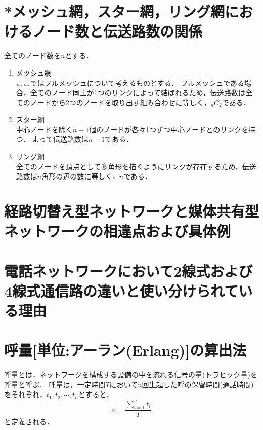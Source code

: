 \documentclass[10.5pt]{jsarticle}
\begin{document}
\section{*メッシュ網，スター網，リング網におけるノード数と伝送路数の関係}
全てのノード数を$n$とする．
\begin{enumerate}
\item{メッシュ網}\\
ここではフルメッシュについて考えるものとする．
フルメッシュである場合，全てのノード同士が1つのリンクによって結ばれるため，伝送路数は全てのノードから2つのノードを取り出す組み合わせに等しく，\underline{${}_nC_2$}である．
\item{スター網}\\
中心ノードを除く$n-1$個のノードが各々1つずつ中心ノードとのリンクを持つ．
よって伝送路数は\underline{$n-1$}である．
\item{リング網}\\
全てのノードを頂点として多角形を描くようにリンクが存在するため，伝送路数は$n$角形の辺の数に等しく，\underline{$n$}である．
\end{enumerate}

\section{経路切替え型ネットワークと媒体共有型ネットワークの相違点および具体例}


\section{電話ネットワークにおいて2線式および4線式通信路の違いと使い分けられている理由}


\section{呼量[単位:アーラン(Erlang)]の算出法}
呼量とは，ネットワークを構成する設備の中を流れる信号の量(トラヒック量)を呼量と呼ぶ．
呼量は，一定時間$T$において$n$回生起した呼の保留時間(通話時間)をそれぞれ，$t_1, t_2, \cdots , t_n$とすると，
\[\displaystyle a = \frac{\displaystyle \sum_{i=1}^n t_i}{T}\]
と定義される．
\end{document}
